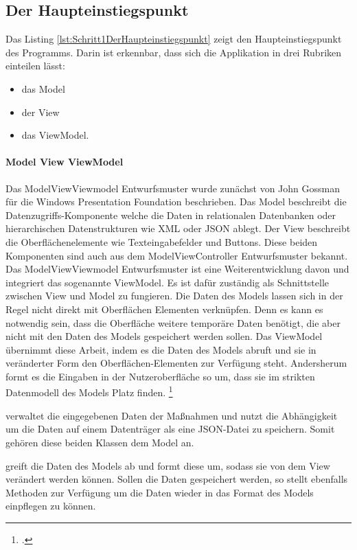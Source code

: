 
\clearpage
\subsection{Der Haupteinstiegspunkt}

Das Listing \ref{lst:Schritt1DerHaupteinstiegspunkt} zeigt den Haupteinstiegspunkt des Programms. Darin ist erkennbar, dass sich die Applikation in drei Rubriken einteilen lässt:
\begin{itemize}
  \item das Model 
  \item der View 
  \item das ViewModel. 
\end{itemize}
\paragraph{Model View ViewModel}
Das ModelViewViewmodel Entwurfsmuster wurde zunächst von John Gossman für die Windows Presentation Foundation beschrieben.
Das Model beschreibt die Datenzugriffs-Komponente welche die Daten in relationalen Datenbanken oder hierarchischen Datenstrukturen wie XML oder JSON ablegt. Der View beschreibt die Oberflächenelemente wie Texteingabefelder und Buttons. Diese beiden Komponenten sind auch aus dem ModelViewController Entwurfsmuster bekannt. Das ModelViewViewmodel Entwurfsmuster ist eine Weiterentwicklung davon und integriert das sogenannte ViewModel. Es ist dafür zuständig als Schnittstelle zwischen View und Model zu fungieren. Die Daten des Models lassen sich in der Regel nicht direkt mit Oberflächen Elementen verknüpfen. Denn es kann es notwendig sein, dass die Oberfläche weitere temporäre Daten benötigt, die aber nicht mit den Daten des Models gespeichert werden sollen. Das ViewModel übernimmt diese Arbeit, indem es die Daten des Models abruft und sie in veränderter Form den Oberflächen-Elementen zur Verfügung steht. Andersherum formt es die Eingaben in der Nutzeroberfläche so um, dass sie im strikten Datenmodell des Models Platz finden. \footcite[Vgl.][]{IntroductionToModelViewViewModelPatternForBuildingWPFApps}

  verwaltet die eingegebenen Daten der Maßnahmen und nutzt die Abhängigkeit   um die Daten auf einem Datenträger als eine JSON-Datei zu speichern. Somit gehören diese beiden Klassen dem Model an.

  greift die Daten des Models ab und formt diese um, sodass sie von dem View   verändert werden können. Sollen die Daten gespeichert werden, so stellt  ebenfalls Methoden zur Verfügung um die Daten wieder in das Format des Models einpflegen zu können.

